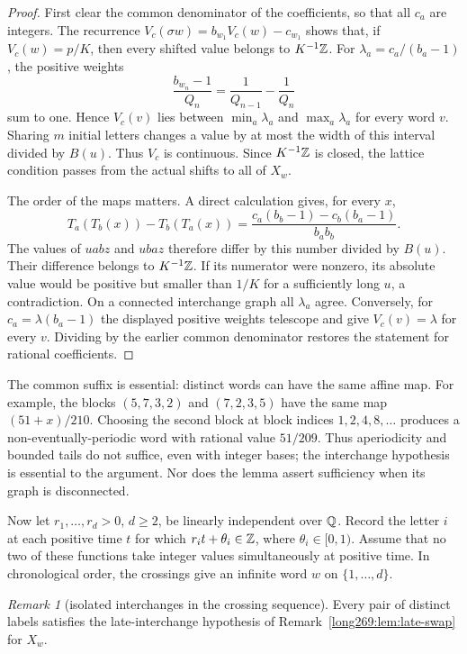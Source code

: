 \documentclass[11pt]{article}
\theoremstyle{remark}
\newtheorem{recordremark}[theorem]{Remark}
\renewenvironment{remark}[1][]{\begin{recordremark}[#1]}{\end{recordremark}}
\theoremstyle{plain}
\begin{document}
\begin{proof}
First clear the common denominator of the coefficients, so that all $c_a$ are
integers.  The recurrence
$V_c(\sigma w)=b_{w_1}V_c(w)-c_{w_1}$ shows that, if
$V_c(w)=p/K$, then every shifted value belongs to $K^{-1}\mathbb{Z}$.
For $\lambda_a=c_a/(b_a-1)$, the positive weights
\[
 \frac{b_{w_n}-1}{Q_n}=\frac1{Q_{n-1}}-\frac1{Q_n}
\]
sum to one.  Hence $V_c(v)$ lies between $\min_a\lambda_a$ and
$\max_a\lambda_a$ for every word $v$.  Sharing $m$ initial letters
changes a value by at most the width of this interval divided by $B(u)$.
Thus $V_c$ is continuous. Since $K^{-1}\mathbb{Z}$ is closed, the lattice
condition passes from the actual shifts to all of $X_w$.

The order of the maps matters.  A direct calculation gives, for every $x$,
\[
 T_a(T_b(x))-T_b(T_a(x))
  =\frac{c_a(b_b-1)-c_b(b_a-1)}{b_ab_b}.
\]
The values of $uabz$ and $ubaz$ therefore differ by this number divided
by $B(u)$.  Their difference belongs to $K^{-1}\mathbb{Z}$.  If its numerator
were nonzero, its absolute value would be positive but smaller than $1/K$
for a sufficiently long $u$, a contradiction.  On a connected interchange
graph all $\lambda_a$ agree.  Conversely, for
$c_a=\lambda(b_a-1)$ the displayed positive weights telescope and give
$V_c(v)=\lambda$ for every $v$.  Dividing by the earlier common denominator restores the statement for rational coefficients.
\end{proof}

The common suffix is essential: distinct words can have the same affine
map.  For example, the blocks $(5,7,3,2)$ and $(7,2,3,5)$ have the same
map $(51+x)/210$.  Choosing the second block at block indices
$1,2,4,8,\ldots$ produces a non-eventually-periodic word with rational
value $51/209$.  Thus aperiodicity and bounded tails do not suffice, even with integer
bases; the interchange hypothesis is essential to the argument.  Nor does the lemma
assert sufficiency when its graph is disconnected.

Now let $r_1,\ldots,r_d>0$, $d\ge2$, be linearly independent over $\mathbb{Q}$.
Record the letter $i$ at each positive time $t$ for which
$r_it+\theta_i\in\mathbb{Z}$, where $\theta_i\in[0,1)$. Assume that no two of
these functions take integer values simultaneously at positive time.
In chronological order, the crossings give an infinite word $w$ on
$\{1,\ldots,d\}$.

\begin{remark}[isolated interchanges in the crossing sequence]
\label{long269:lem:clock-swaps}
Every pair of distinct labels satisfies the late-interchange
hypothesis of Remark~\ref{long269:lem:late-swap} for $X_w$.
\end{remark}
\end{document}

